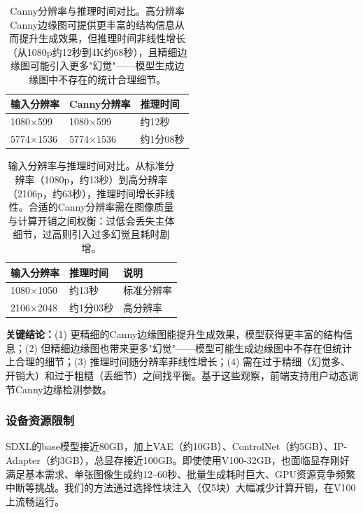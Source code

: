\documentclass[twocolumn,a4paper,11pt]{ctexart}
\begin{document}
\begin{table}[ht]
  \centering
  \caption{Canny分辨率与推理时间对比。高分辨率Canny边缘图可提供更丰富的结构信息从而提升生成效果，但推理时间非线性增长（从1080p约12秒到4K约68秒），且精细边缘图可能引入更多"幻觉"——模型生成边缘图中不存在的统计合理细节。}
  \label{tab:resolution_canny}
  \small
  \begin{tabular}{lll}
    \toprule
    输入分辨率 & Canny分辨率 & 推理时间 \\
    \midrule
    1080$\times$599   & 1080$\times$599   & 约12秒 \\
    5774$\times$1536  & 5774$\times$1536  & 约1分08秒 \\
    \bottomrule
  \end{tabular}
\end{table}

\begin{table}[ht]
  \centering
  \caption{输入分辨率与推理时间对比。从标准分辨率（1080p，约13秒）到高分辨率（2106p，约63秒），推理时间增长非线性。合适的Canny分辨率需在图像质量与计算开销之间权衡：过低会丢失主体细节，过高则引入过多幻觉且耗时剧增。}
  \label{tab:resolution_input}
  \small
  \begin{tabular}{lll}
    \toprule
    输入分辨率 & 推理时间 & 说明 \\
    \midrule
    1080$\times$1050  & 约13秒   & 标准分辨率 \\
    2106$\times$2048  & 约1分03秒 & 高分辨率 \\
    \bottomrule
  \end{tabular}
\end{table}

\textbf{关键结论：}(1) 更精细的Canny边缘图能提升生成效果，模型获得更丰富的结构信息；(2) 但精细边缘图也带来更多"幻觉"——模型可能生成边缘图中不存在但统计上合理的细节；(3) 推理时间随分辨率非线性增长；(4) 需在过于精细（幻觉多、开销大）和过于粗糙（丢细节）之间找平衡。基于这些观察，前端支持用户动态调节Canny边缘检测参数。

\subsubsection{设备资源限制}

SDXL的base模型接近80GB，加上VAE（约10GB）、ControlNet（约5GB）、IP-Adapter（约3GB），总显存接近100GB。即使使用V100-32GB，也面临显存刚好满足基本需求、单张图像生成约12--60秒、批量生成耗时巨大、GPU资源竞争频繁中断等挑战。我们的方法通过选择性块注入（仅5块）大幅减少计算开销，在V100上流畅运行。
\end{document}
